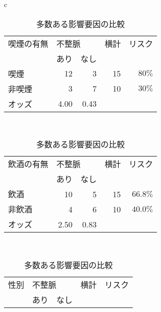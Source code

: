 \documentclass{ltjsarticle}
\begin{document}
\begin{table}[b]
    \caption{多数ある影響要因の比較}
    \label{tbl:score_2}
    \centering
    \begin{tabular}{c}
        \begin{minipage}{0.4\hsize}
            \centering
            \begin{tabular}{l|r|r|r|r} \hline 
                \multicolumn{1}{l}{喫煙の有無} & \multicolumn{2}{|l|}{不整脈} & \multicolumn{1}{l|}{横計} & \multicolumn{1}{l}{リスク}\\ \cline{2-3}
                & あり & なし & & \\ \hline \hline
                喫煙 & 12 & 3 & 15 & $80\%$ \\
                非喫煙 & 3 & 7 & 10 & $30\%$ \\ \hline 
                オッズ & 4.00 & 0.43 & \multicolumn{2}{|l}{} \\ \hline
            \end{tabular}
        \end{minipage} \\
        \begin{minipage}{0.4\hsize}
            \centering
            \begin{tabular}{l|r|r|r|r} \hline 
                \multicolumn{1}{l}{飲酒の有無} & \multicolumn{2}{|l|}{不整脈} & \multicolumn{1}{l|}{横計} & \multicolumn{1}{l}{リスク}\\ \cline{2-3}
                & あり & なし & & \\ \hline \hline
                飲酒 & 10 & 5 & 15 & $66.8\%$ \\
                非飲酒 & 4 & 6 & 10 & $40.0\%$ \\ \hline 
                オッズ & 2.50 & 0.83 & \multicolumn{2}{|l}{} \\ \hline
            \end{tabular}
        \end{minipage} \\
        \begin{minipage}{0.4\hsize}
            \centering
            \begin{tabular}{l|r|r|r|r} \hline 
                \multicolumn{1}{l}{性別} & \multicolumn{2}{|l|}{不整脈} & \multicolumn{1}{l|}{横計} & \multicolumn{1}{l}{リスク}\\ \cline{2-3}
                & あり & なし & & \\ \hline \hline

\end{tabular}
\end{minipage}
\end{tabular}
\end{table}
\end{document}
